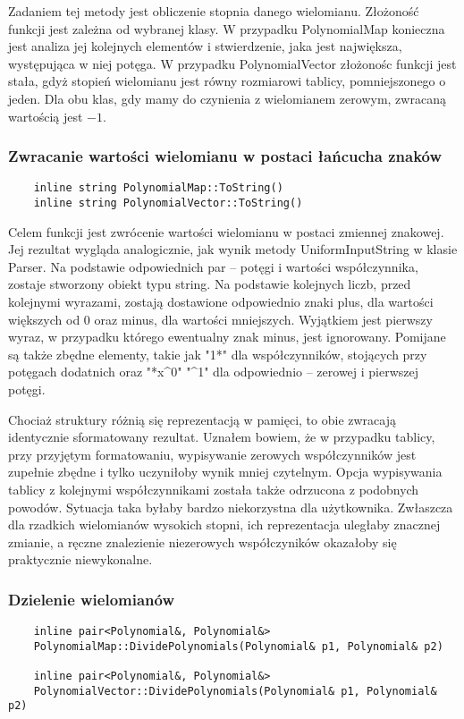 \documentclass[oneside,a4paper]{book}
\begin{document}
	Zadaniem tej metody jest obliczenie stopnia danego wielomianu. Złożoność funkcji jest zależna od wybranej klasy. W przypadku PolynomialMap konieczna jest analiza jej kolejnych elementów i stwierdzenie, jaka jest największa, występująca w niej potęga. W przypadku PolynomialVector złożonośc funkcji jest stała, gdyż stopień wielomianu jest równy rozmiarowi tablicy, pomniejszonego o jeden. Dla obu klas, gdy mamy do czynienia z wielomianem zerowym, zwracaną wartością jest $-1$.
	\\
	
	\subsubsection{Zwracanie wartości wielomianu w postaci łańcucha znaków}
	\begin{lstlisting}
	inline string PolynomialMap::ToString()
	inline string PolynomialVector::ToString()
	\end{lstlisting}
	
	Celem funkcji jest zwrócenie wartości wielomianu w postaci zmiennej znakowej. Jej rezultat wygląda analogicznie, jak wynik metody UniformInputString w klasie Parser. Na podstawie odpowiednich par – potęgi i wartości współczynnika, zostaje stworzony obiekt typu string. Na podstawie kolejnych liczb, przed kolejnymi wyrazami, zostają dostawione odpowiednio znaki plus, dla wartości większych od $0$ oraz minus, dla wartości mniejszych. Wyjątkiem jest pierwszy wyraz, w przypadku którego ewentualny znak minus, jest ignorowany. Pomijane są także zbędne elementy, takie jak "1*" dla współczynników, stojących przy potęgach dodatnich oraz "*x\^{}0" "\^{}1" dla odpowiednio – zerowej i pierwszej potęgi.
	
	Chociaż struktury różnią się reprezentacją w pamięci, to obie zwracają identycznie sformatowany rezultat. Uznałem bowiem, że w przypadku tablicy, przy przyjętym formatowaniu, wypisywanie zerowych współczynników jest zupełnie zbędne i tylko uczyniłoby wynik mniej czytelnym. Opcja wypisywania tablicy z kolejnymi współczynnikami została także odrzucona z podobnych powodów. Sytuacja taka byłaby bardzo niekorzystna dla użytkownika. Zwłaszcza dla rzadkich wielomianów wysokich stopni, ich reprezentacja uległaby znacznej zmianie, a ręczne znalezienie niezerowych współczyników okazałoby się praktycznie niewykonalne. 
	\\
	
	\subsubsection{Dzielenie wielomianów}
	\begin{lstlisting}
	inline pair<Polynomial&, Polynomial&>
	PolynomialMap::DividePolynomials(Polynomial& p1, Polynomial& p2)
	
	inline pair<Polynomial&, Polynomial&>
	PolynomialVector::DividePolynomials(Polynomial& p1, Polynomial& p2)
	\end{lstlisting}
	
\end{document}
